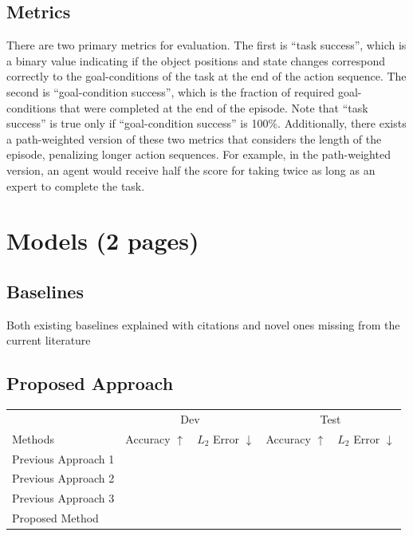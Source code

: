 \documentclass[11pt,a4paper]{article}
\begin{document}
\subsection{Metrics}
There are two primary metrics for evaluation. The first is ``task success'', which is a binary value indicating if the object positions and state changes correspond correctly to the goal-conditions of the task at the end of the action sequence. The second is ``goal-condition success'', which is the fraction of required goal-conditions that were completed at the end of the episode. Note that ``task success'' is true only if ``goal-condition success'' is 100\%. Additionally, there exists a path-weighted version of these two metrics that considers the length of the episode, penalizing longer action sequences. For example, in the path-weighted version, an agent would receive half the score for taking twice as long as an expert to complete the task.

\clearpage
\section{Models (2 pages)}

\subsection{Baselines}
Both existing baselines explained with citations and novel ones missing from the current literature

\subsection{Proposed Approach}

\clearpage
\begin{table}[t]
\centering
\begin{tabular}{lrrrr}
\toprule
                            & \multicolumn{2}{c}{Dev} & \multicolumn{2}{c}{Test}\\
Methods                     & Accuracy $\uparrow$ & $L_2$ Error $\downarrow$ & Accuracy $\uparrow$ & $L_2$ Error $\downarrow$ \\
\midrule
Previous Approach 1 \cite{} & & & & \\
Previous Approach 2 \cite{} & & & & \\
Previous Approach 3 \cite{} & & & & \\
\midrule
Proposed Method             & & & & \\
\bottomrule
\end{tabular}
\end{table}
\end{document}
